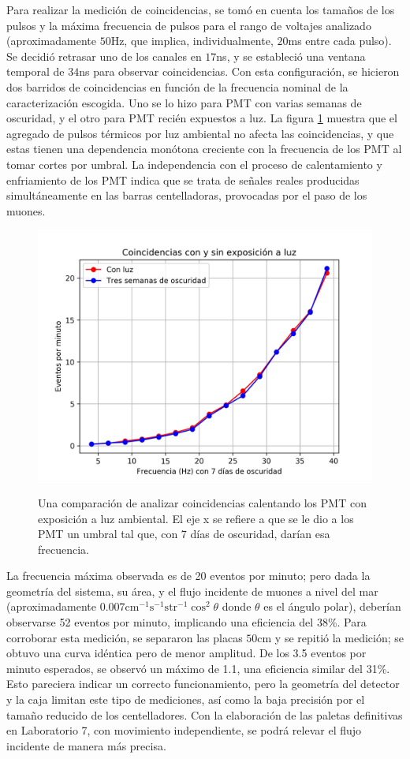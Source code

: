 \documentclass[12pt,a4paper]{article}
\numberwithin{equation}{section}
\begin{document}
Para realizar la medición de coincidencias, se tomó en cuenta los tamaños de los pulsos y la máxima frecuencia de pulsos para el rango de voltajes analizado (aproximadamente $50$Hz, que implica, individualmente, $20$ms entre cada pulso). Se decidió retrasar uno de los canales en $17$ns, y se estableció una ventana temporal de $34$ns para observar coincidencias. Con esta configuración, se hicieron dos barridos de coincidencias en función de la frecuencia nominal de la caracterización escogida. Uno se lo hizo para PMT con varias semanas de oscuridad, y el otro para PMT recién expuestos a luz. La figura \ref{fig:tengocalor} muestra que el agregado de pulsos térmicos por luz ambiental no afecta las coincidencias, y que estas tienen una dependencia monótona creciente con la frecuencia de los PMT al tomar cortes por umbral. La independencia con el proceso de calentamiento y enfriamiento de los PMT indica que se trata de señales reales producidas simultáneamente en las barras centelladoras, provocadas por el paso de los muones.

\begin{figure}[h]
	\centering
	\includegraphics[width=.7\linewidth]{imgs/calentamiento.jpg}
	\label{fig:tengocalor}
	\caption{Una comparación de analizar coincidencias calentando los PMT con exposición a luz ambiental. El eje x se refiere a que se le dio a los PMT un umbral tal que, con 7 días de oscuridad, darían esa frecuencia.}
\end{figure}

La frecuencia máxima observada es de 20 eventos por minuto; pero dada la geometría del sistema, su área, y el flujo incidente de muones a nivel del mar (aproximadamente $0.007\text{cm}^{-1}\text{s}^{-1}\text{str}^{-1}\cos^2\theta$ donde $\theta$ es el ángulo polar), deberían observarse 52 eventos por minuto\cite{matematico_aleman}\cite{fisico_chino}, implicando una eficiencia del 38\%. Para corroborar esta medición, se separaron las placas $50$cm y se repitió la medición; se obtuvo una curva idéntica pero de menor amplitud. De los 3.5 eventos por minuto esperados, se observó un máximo de 1.1, una eficiencia similar del 31\%. Esto pareciera indicar un correcto funcionamiento, pero la geometría del detector y la caja limitan este tipo de mediciones, así como la baja precisión por el tamaño reducido de los centelladores. Con la elaboración de las paletas definitivas en Laboratorio 7, con movimiento independiente, se podrá relevar el flujo incidente de manera más precisa.
\end{document}
